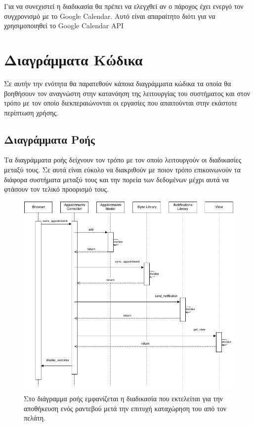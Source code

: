 Για να συνεχιστεί η διαδικασία θα πρέπει να ελεγχθεί αν ο πάροχος έχει ενεργό τον συγχρονισμό με το Google Calendar. Αυτό είναι απαραίτητο διότι για να χρησιμοποιηθεί το Google Calendar API 

\section{Διαγράμματα Κώδικα}
Σε αυτήν την ενότητα θα παρατεθούν κάποια διαγράμματα κώδικα τα οποία θα βοηθήσουν τον αναγνώστη στην κατανόηση της λειτουργίας του συστήματος και στον τρόπο με τον οποίο διεκπεραιώνονται οι εργασίες που απαιτούνται στην εκάστοτε περίπτωση χρήσης.

\subsection{Διαγράμματα Ροής}
Τα διαγράμματα ροής δείχνουν τον τρόπο με τον οποίο λειτουργούν οι διαδικασίες μεταξύ τους. Σε αυτά είναι εύκολο να διακριθούν με ποιον τρόπο επικοινωνούν τα διάφορα συστήματα μεταξύ τους και την πορεία των δεδομένων μέχρι αυτά να φτάσουν τον τελικό προορισμό τους. 

\begin{figure}[H]
\centering
\includegraphics[width=150mm]{images/sd-save-appointment.png}
\caption{Στο διάγραμμα ροής εμφανίζεται η διαδικασία που εκτελείται για την αποθήκευση ενός ραντεβού μετά την επιτυχή καταχώρηση του από τον πελάτη.}
\label{sd-save-appointment}
\end{figure}

